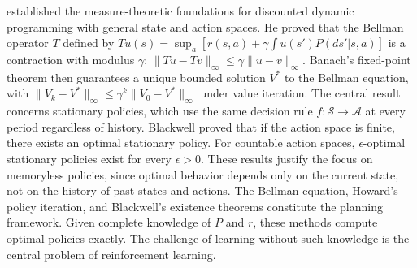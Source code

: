 \citet{blackwell1965} established the measure-theoretic foundations for discounted dynamic programming with general state and action spaces. He proved that the Bellman operator $T$ defined by $Tu(s) = \sup_a [r(s,a) + \gamma \int u(s') P(ds'|s,a)]$ is a contraction with modulus $\gamma$: $\|Tu - Tv\|_\infty \leq \gamma \|u - v\|_\infty$. Banach's fixed-point theorem then guarantees a unique bounded solution $V^*$ to the Bellman equation, with $\|V_k - V^*\|_\infty \leq \gamma^k \|V_0 - V^*\|_\infty$ under value iteration. The central result concerns stationary policies, which use the same decision rule $f: \mathcal{S} \to \mathcal{A}$ at every period regardless of history. Blackwell proved that if the action space is finite, there exists an optimal stationary policy. For countable action spaces, $\epsilon$-optimal stationary policies exist for every $\epsilon > 0$. These results justify the focus on memoryless policies, since optimal behavior depends only on the current state, not on the history of past states and actions. The Bellman equation, Howard's policy iteration, and Blackwell's existence theorems constitute the planning framework. Given complete knowledge of $P$ and $r$, these methods compute optimal policies exactly. The challenge of learning without such knowledge is the central problem of reinforcement learning.

